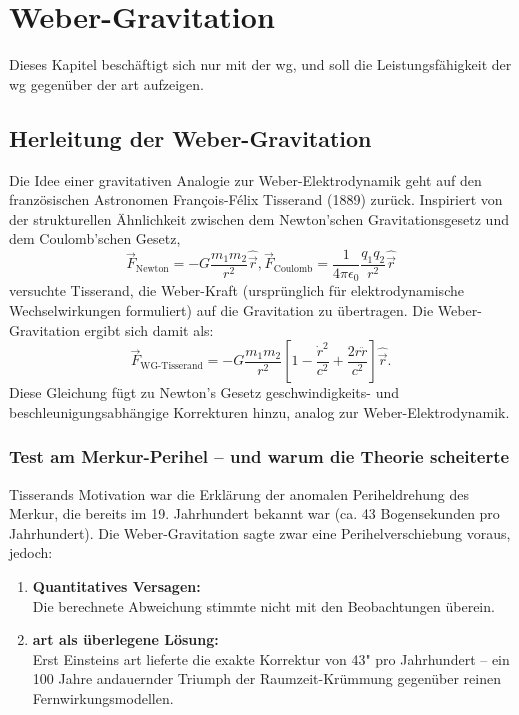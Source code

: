 \chapter{Weber-Gravitation}
Dieses Kapitel beschäftigt sich nur mit der \gls{wg}, und soll die Leistungsfähigkeit der \gls{wg} gegenüber der \gls{art} aufzeigen.
\section{Herleitung der Weber-Gravitation}
Die Idee einer gravitativen Analogie zur Weber-Elektrodynamik geht auf den französischen Astronomen François-Félix Tisserand (1889) zurück. Inspiriert von der strukturellen
Ähnlichkeit zwischen dem Newton’schen Gravitationsgesetz und dem Coulomb’schen Gesetz,
\begin{equation}
    \vec{F}_{\text{Newton}} = -G \frac{m_1 m_2}{r^2} \hat{\vec{r}}, \vec{F}_{\text{Coulomb}} = \frac{1}{4 \pi \epsilon_0} \frac{q_1 q_2}{r^2} \hat{\vec{r}}
\end{equation}
versuchte Tisserand, die Weber-Kraft (ursprünglich für elektrodynamische Wechselwirkungen formuliert) auf die Gravitation zu übertragen. Die Weber-Gravitation ergibt sich damit als:
\begin{equation}
    \vec{F}_{\text{WG-Tisserand}} = -G \frac{m_1 m_2}{r^2} \left[ 1 - \frac{\dot{r}^2}{c^2} + \frac{2 r \ddot{r}}{c^2} \right] \hat{\vec{r}}.
\end{equation}
Diese Gleichung fügt zu Newton’s Gesetz geschwindigkeits- und beschleunigungsabhängige Korrekturen hinzu, analog zur Weber-Elektrodynamik.
\subsection{Test am Merkur-Perihel – und warum die Theorie scheiterte}
Tisserands Motivation war die Erklärung der anomalen Periheldrehung des Merkur, die bereits im 19. Jahrhundert bekannt war (ca. 43 Bogensekunden pro Jahrhundert).
Die Weber-Gravitation sagte zwar eine Perihelverschiebung voraus, jedoch:
\begin{enumerate}
    \item \textbf{Quantitatives Versagen:}\\Die berechnete Abweichung stimmte nicht mit den Beobachtungen überein.
    \item \textbf{\gls{art} als überlegene Lösung:}\\Erst Einsteins \gls{art} lieferte die exakte Korrektur von 43" pro Jahrhundert – ein 100 Jahre andauernder Triumph der
    Raumzeit-Krümmung gegenüber reinen Fernwirkungsmodellen.
\end{enumerate}

